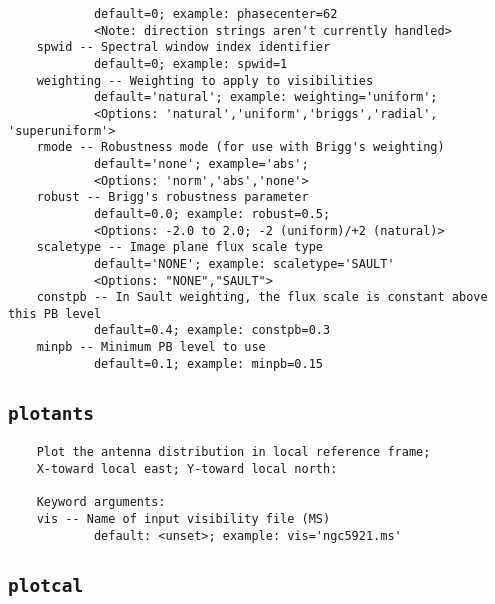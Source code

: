 \begin{verbatim}
            default=0; example: phasecenter=62
            <Note: direction strings aren't currently handled>
    spwid -- Spectral window index identifier
            default=0; example: spwid=1
    weighting -- Weighting to apply to visibilities
            default='natural'; example: weighting='uniform'; 
            <Options: 'natural','uniform','briggs','radial', 'superuniform'>
    rmode -- Robustness mode (for use with Brigg's weighting)
            default='none'; example='abs'; 
            <Options: 'norm','abs','none'>
    robust -- Brigg's robustness parameter 
            default=0.0; example: robust=0.5; 
            <Options: -2.0 to 2.0; -2 (uniform)/+2 (natural)>
    scaletype -- Image plane flux scale type
            default='NONE'; example: scaletype='SAULT'
            <Options: "NONE","SAULT">
    constpb -- In Sault weighting, the flux scale is constant above this PB level
            default=0.4; example: constpb=0.3
    minpb -- Minimum PB level to use
            default=0.1; example: minpb=0.15
\end{verbatim}
\normalsize


\subsection{{\tt plotants}}
\label{section:tasks.plotants}

\small
\begin{verbatim}
    Plot the antenna distribution in local reference frame; 
    X-toward local east; Y-toward local north:
    
    Keyword arguments:
    vis -- Name of input visibility file (MS)
            default: <unset>; example: vis='ngc5921.ms'

\end{verbatim}
\normalsize


\subsection{{\tt plotcal}}
\label{section:tasks.plotcal}

